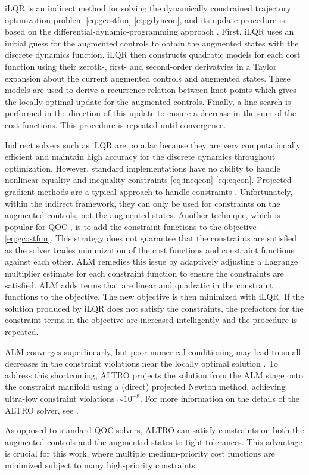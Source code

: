 iLQR is an indirect method
for solving the dynamically constrained
trajectory optimization problem \eqref{eq:gcostfun}-\eqref{eq:gdyncon},
and its update procedure is based on the differential-dynamic-programming approach
\cite{mayne1966a}.
First, iLQR uses an initial guess for the augmented controls to obtain the augmented
states with the discrete dynamics function.
iLQR then constructs quadratic models for each cost function using
their zeroth-, first- and second-order derivatvies in a Taylor expansion
about the current augmented controls and augmented states.
These models are used to derive a recurrence relation between knot points
which gives the locally optimal update for the augmented controls.
Finally, a line search \cite{zhang2006global}
is performed in the direction of this update to ensure a
decrease in the sum of the cost functions. This procedure
is repeated until convergence.

Indirect solvers such as iLQR are popular
because they are very computationally efficient and maintain
high accuracy for the discrete dynamics throughout optimization.
However, standard implementations have no ability to handle
nonlinear equality and inequality
constraints \eqref{eq:ineqcon}-\eqref{eq:eqcon}.
Projected gradient methods are a typical approach
to handle constraints
\cite{clarkson2010coresets, hauswirth2016projected, morzhin2019minimal,
  nikolskii2007convergence}. Unfortunately, within the indirect framework,
they can only be used for constraints on the augmented controls,
not the augmented states.
Another technique, which is popular for QOC \cite{leung2017speedup},
is to add the constraint functions to the objective
\eqref{eq:gcostfun}. 
This strategy does not guarantee that the constraints
are satisfied as the solver trades
minimization of the cost functions and constraint functions against each other.
ALM remedies this issue by adaptively adjusting a Lagrange multiplier estimate
for each constraint function to ensure the constraints are satisfied.
ALM adds terms that are linear and quadratic in the constraint functions
to the objective. The new objective is then minimized with
iLQR. If the solution produced by iLQR does not satisfy the constraints,
the prefactors for the constraint terms in the objective are increased
intelligently and the procedure is repeated.

ALM converges superlinearly, but poor numerical conditioning may lead
to small decreases in the constraint violations near the locally optimal solution
\cite{bertsekas1996constrained}.
To address this shortcoming, ALTRO
projects the solution from the ALM stage onto the constraint manifold using
a (direct) projected Newton method, achieving ultra-low
constraint violations $\sim 10^{-8}$.
For more information on the details of the ALTRO
solver, see \cite{howell2019altro, Jackson2020altroc}.

As opposed to standard QOC solvers, ALTRO
can satisfy constraints
on both the augmented controls and the augmented states to tight tolerances.
This advantage is crucial for this work, where multiple medium-priority cost functions
are minimized subject to many high-priority constraints.
